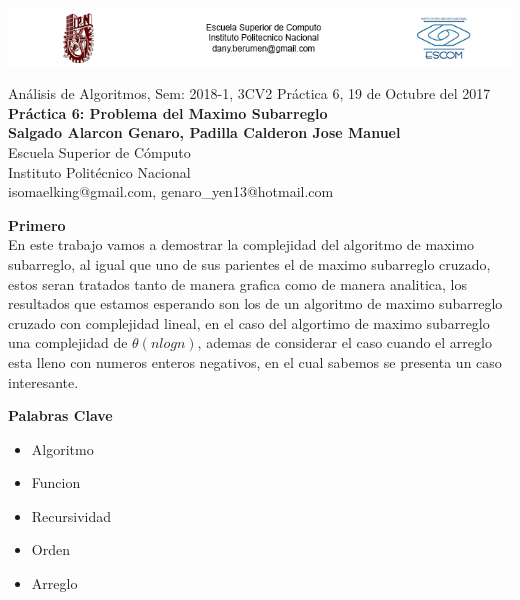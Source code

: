 \documentclass[spanish]{article}
\begin{document}
\includegraphics[width=1\textwidth, right]{./imagenes/logos.png}
	\setmarginsrb{30mm}{30mm}{30mm}{30mm}{0pt}{0mm}{0pt}{0mm}
	
	\begin{center}
	{\Large Análisis de Algoritmos, Sem: 2018-1, 3CV2 Práctica 6, 19 de Octubre del 2017}\\
{\huge {\bf Práctica 6: Problema del Maximo Subarreglo}} \\
{\large {\bf Salgado Alarcon Genaro, Padilla Calderon Jose Manuel}\\
Escuela Superior de Cómputo \\
Instituto Politécnico Nacional}\\
isomaelking@gmail.com, genaro\_yen13@hotmail.com\\
	\end{center}

	
	\bigskip
	
	\bigskip
	
	\bigskip
	
	{\LARGE {\bf Primero}}\\
	
	En este trabajo vamos a demostrar la complejidad del algoritmo de maximo subarreglo, al igual que uno de sus parientes el de maximo subarreglo cruzado, estos seran tratados tanto de manera grafica como de manera analitica, los resultados que estamos esperando son los de un algoritmo de maximo subarreglo cruzado con complejidad lineal, en el caso del algortimo de maximo subarreglo una complejidad de $\theta(nlogn)$, ademas de considerar el caso cuando el arreglo esta lleno con numeros enteros negativos, en el cual sabemos se presenta un caso interesante.

	\bigskip


	{\Large {\bf Palabras Clave}}\\
	\begin{itemize}
		\item Algoritmo
		\item Funcion
		\item Recursividad
		\item Orden
		\item Arreglo
	\end{itemize}
	
\end{document}
